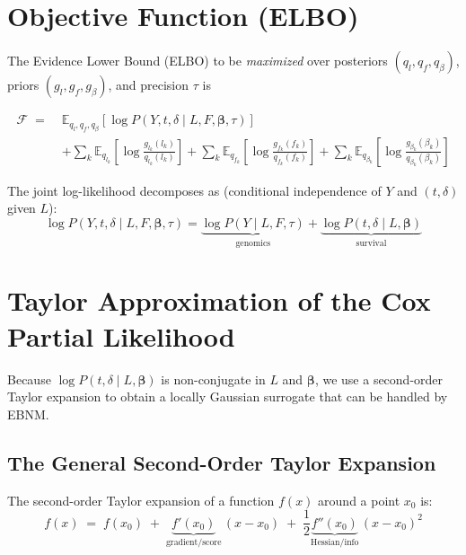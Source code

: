 \documentclass[11pt]{article}
\begin{document}
\section{Objective Function (ELBO)}\label{sec:elbo}

The Evidence Lower Bound (ELBO) to be \emph{maximized} over posteriors
$(q_l, q_f, q_\beta)$, priors $(g_l, g_f, g_\beta)$, and precision $\tau$ is

\begin{align}\label{eq:elbo}
  \mathcal{F} \;=\;&
  \mathbb{E}_{q_l, q_f, q_\beta}\!\left[\log P(Y, t, \delta \mid L, F,\bm{\beta}, \tau)\right]
  \nonumber\\
  &+ \sum_k \mathbb{E}_{q_{l_k}}\!\left[\log\frac{g_{l_k}(l_k)}{q_{l_k}(l_k)}\right]
   + \sum_k \mathbb{E}_{q_{f_k}}\!\left[\log\frac{g_{f_k}(f_k)}{q_{f_k}(f_k)}\right]
   + \sum_k \mathbb{E}_{q_{\beta_k}}\!\left[\log\frac{g_{\beta_k}(\beta_k)}{q_{\beta_k}(\beta_k)}\right]
\end{align}

The joint log-likelihood decomposes as (conditional independence of $Y$ and
$(t,\delta)$ given $L$):
\begin{equation}\label{eq:lik-decomp}
  \log P(Y, t, \delta \mid L, F,\bm{\beta}, \tau)
  = \underbrace{\log P(Y \mid L, F, \tau)}_{\text{genomics}}
  + \underbrace{\log P(t, \delta \mid L, \bm{\beta})}_{\text{survival}}
\end{equation}

\section{Taylor Approximation of the Cox Partial Likelihood}\label{sec:taylor}

Because $\log P(t,\delta \mid L,\bm{\beta})$ is non-conjugate in $L$ and
$\bm{\beta}$, we use a second-order Taylor expansion to obtain a locally
Gaussian surrogate that can be handled by EBNM.

\subsection{The General Second-Order Taylor Expansion}

The second-order Taylor expansion of a function $f(x)$ around a point $x_0$
is:
\begin{equation}\label{eq:taylor-general}
  f(x) \;=\; f(x_0)
  \;+\; \underbrace{f'(x_0)}_{\text{gradient/score}}\,(x - x_0)
  \;+\; \frac{1}{2}\underbrace{f''(x_0)}_{\text{Hessian/info}}\,(x - x_0)^2
\end{equation}
\end{document}
